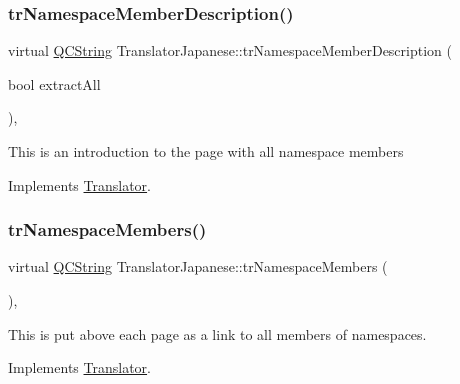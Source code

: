 \mbox{\label{class_translator_japanese_a19a57945319cbc2bf83d26939c812517}} 
\subsubsection{\texorpdfstring{trNamespaceMemberDescription()}{trNamespaceMemberDescription()}}
{\footnotesize\ttfamily virtual \mbox{\hyperlink{class_q_c_string}{Q\+C\+String}} Translator\+Japanese\+::tr\+Namespace\+Member\+Description (\begin{DoxyParamCaption}\item[{bool}]{extract\+All }\end{DoxyParamCaption})\hspace{0.3cm}{\ttfamily [inline]}, {\ttfamily [virtual]}}

This is an introduction to the page with all namespace members 

Implements \mbox{\hyperlink{class_translator}{Translator}}.

\mbox{\label{class_translator_japanese_ae0bfa7eb76fed603dba4b1356639acda}} 
\subsubsection{\texorpdfstring{trNamespaceMembers()}{trNamespaceMembers()}}
{\footnotesize\ttfamily virtual \mbox{\hyperlink{class_q_c_string}{Q\+C\+String}} Translator\+Japanese\+::tr\+Namespace\+Members (\begin{DoxyParamCaption}{ }\end{DoxyParamCaption})\hspace{0.3cm}{\ttfamily [inline]}, {\ttfamily [virtual]}}

This is put above each page as a link to all members of namespaces. 

Implements \mbox{\hyperlink{class_translator}{Translator}}.

\mbox{\label{class_translator_japanese_ae7a1df4f20d47fc74cd3531309f6ac2a}} 
